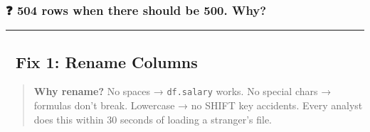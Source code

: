 \documentclass[
]{article}
\newenvironment{Shaded}{\begin{snugshade}}{\end{snugshade}}
\newcommand{\NormalTok}[1]{#1}
\newcommand{\OperatorTok}[1]{\textcolor[rgb]{0.81,0.36,0.00}{\textbf{#1}}}
\newcommand{\StringTok}[1]{\textcolor[rgb]{0.31,0.60,0.02}{#1}}
\begin{document}
\subsubsection{❓ 504 rows when there should be 500.
Why?}\label{rows-when-there-should-be-500.-why}

\begin{center}\rule{0.5\linewidth}{0.5pt}\end{center}

\subsection{🔧 Fix 1: Rename Columns}\label{fix-1-rename-columns}

\begin{Shaded}
\end{Shaded}

\begin{quote}
\textbf{Why rename?} No spaces → \texttt{df.salary} works. No special
chars → formulas don't break. Lowercase → no SHIFT key accidents. Every
analyst does this within 30 seconds of loading a stranger's file.
\end{quote}
\end{document}

